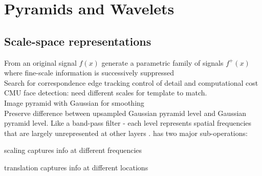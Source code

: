 \section{Pyramids and Wavelets}
\subsection*{Scale-space representations}
From an original signal $f(x)$ generate a parametric family of signals $f^+(x)$ where fine-scale information is successively suppressed  \\
 Search for correspondence  edge tracking  control of detail and computational cost \\
 CMU face detection: need different scales for template to match.\\
 Image pyramid with Gaussian for smoothing\\
 Preserve difference between upsampled Gaussian pyramid level and Gaussian pyramid level. Like a band-pass filter - each level represents spatial frequencies that are largely unrepresented at other layers .
 has two major sub-operations:
\begin{compactenum}
    \item scaling captures info at different frequencies
    \item translation captures info at different locations
\end{compactenum}